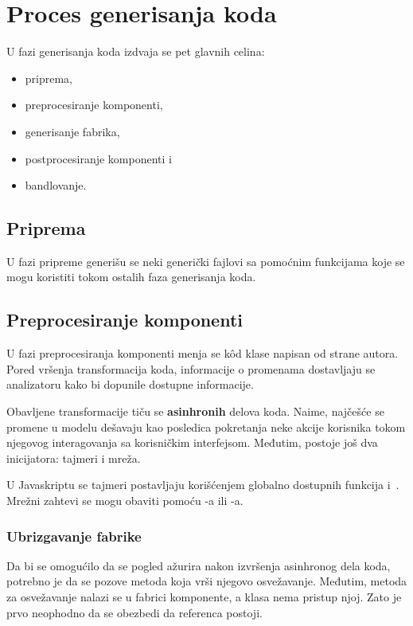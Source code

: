 \section{Proces generisanja koda}

U fazi generisanja koda izdvaja se pet glavnih celina:

\begin{itemize}
  \item priprema,
  \item preprocesiranje komponenti,
  \item generisanje fabrika,
  \item postprocesiranje komponenti i
  \item bandlovanje.
\end{itemize}

\subsection{Priprema}

U fazi pripreme generišu se neki generički fajlovi sa pomoćnim funkcijama koje se mogu koristiti tokom ostalih faza generisanja koda.

\subsection{Preprocesiranje komponenti}

U fazi preprocesiranja komponenti menja se k\^od klase napisan od strane autora.
Pored vršenja transformacija koda, informacije o promenama dostavljaju se analizatoru kako bi dopunile dostupne informacije.

Obavljene transformacije tiču se \textbf{asinhronih} delova koda.
Naime, najčešće se promene u modelu dešavaju kao posledica pokretanja neke akcije korisnika tokom njegovog interagovanja sa korisničkim interfejsom.
Međutim, postoje još dva inicijatora: tajmeri i mreža.

U Javaskriptu se tajmeri postavljaju korišćenjem globalno dostupnih funk\-ci\-ja  i~.
Mrežni zahtevi se mogu obaviti pomoću -a ili -a.

\subsubsection{Ubrizgavanje fabrike}
\label{subsubsec:ubrizgavanje-fabrike}

Da bi se omogućilo da se pogled ažurira nakon izvršenja asinhronog dela koda, potrebno je da se pozove metoda koja vrši njegovo osvežavanje.
Međutim, metoda za osvežavanje nalazi se u fabrici komponente, a klasa nema pristup njoj.
Zato je prvo neophodno da se obezbedi da referenca postoji.


